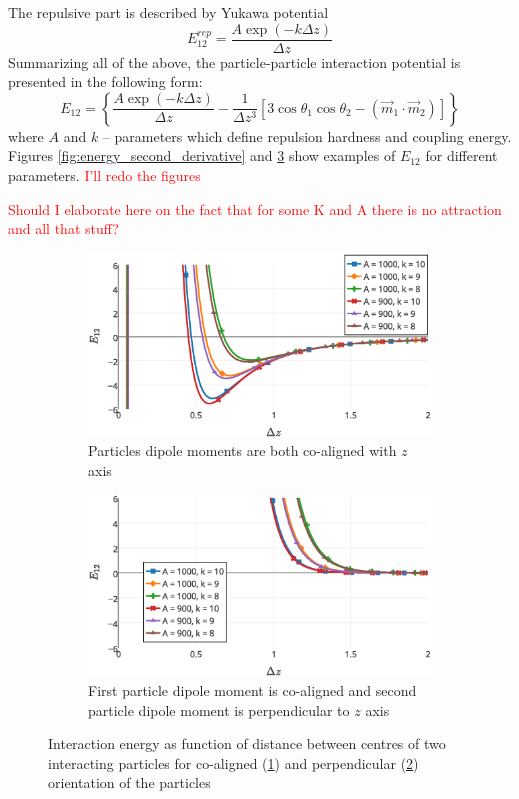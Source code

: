 \documentclass[12pt,a4paper]{article}
\begin{document}
The repulsive part is described by Yukawa potential
\label{eq_yukawa_interaction}
\begin{equation}
E_{12}^{rep} = \frac{A \exp(-k \Delta z)}{\Delta z}
\end{equation}
Summarizing all of the above, the particle-particle interaction potential is presented in the following form:
\label{eq_full_particle_particle_interraction}
\begin{equation}
E_{12} = \left\{ \frac{A \exp(-k \Delta z)}{\Delta z} -  \frac{1}{\Delta z^3} [3 \cos \theta_1 \cos \theta_2 - (\vec{m}_1 \cdot \vec{m}_2)]\right\}
\end{equation}
where $A$ and $k$ -- parameters which define repulsion hardness and coupling energy. Figures \ref{fig:energy_second_derivative} and \ref{fig:interaction_energy} show examples of $E_{12}$ for different parameters. \textcolor{red}{I'll redo the figures}

\textcolor{red}{Should I elaborate here on the fact that for some K and A there is no attraction and all that stuff?}

\begin{figure}[h]
\begin{subfigure}{\textwidth}
	\centering
	\includegraphics[width=.6\textwidth]{Enegy_r_difAK}
	\captionsetup{justification=centering, width=0.7\textwidth, singlelinecheck=false}
	\caption{Particles dipole moments are both co-aligned with $z$ axis}
    \label{fig:interaction_energy_coaligned}
\end{subfigure}

\begin{subfigure}{\textwidth}
	\centering
	\includegraphics[width=.6\textwidth]{Enegy_r_difAK_perp}
	\captionsetup{justification=centering, width=0.7\textwidth, singlelinecheck=false}
	\caption{First particle dipole moment is co-aligned and second particle dipole moment is perpendicular to $z$ axis}
    \label{fig:interaction_energy_counteraligned}
\end{subfigure}
\captionsetup{justification=centering, width=0.8\textwidth}
\caption{Interaction energy as function of distance between centres of two interacting particles for co-aligned (\ref{fig:interaction_energy_coaligned}) and perpendicular (\ref{fig:interaction_energy_counteraligned}) orientation of the particles}
\label{fig:interaction_energy}
\end{figure}
\end{document}
